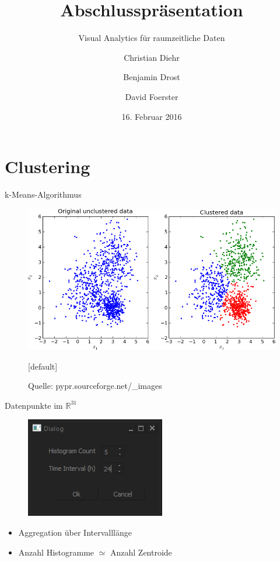 \documentclass{beamer}
\title{Abschlusspräsentation}
\subtitle{Visual Analytics für raumzeitliche Daten}
\author{Christian Diehr \and Benjamin Drost \and David Foerster}
\institute{Institut für Informatik\\Humboldt-Universität zu Berlin}
\date{16. Februar 2016}
\begin{document}
    \begin{frame}
        \titlepage
    \end{frame}
    \logo %

    \section{Clustering}
    \begin{frame}{k-Means-Algorithmus}
		\begin{figure}
			\centering\includegraphics[width=.7\textwidth]{kmeans.png}
			\caption{Quelle: pypr.sourceforge.net/\_images}
		\end{figure}
    \end{frame}

    \begin{frame}{Datenpunkte im $\mathds{R}^{31}$}
    	\begin{figure}
    		\centering\includegraphics[width=.4\textwidth]{dialog.png}
    	\end{figure}
    	\begin{itemize}
    		\setlength\itemsep{1em}
    		\item Aggregation über Intervalllänge
    		\item Anzahl Histogramme $\simeq$ Anzahl Zentroide
    	\end{itemize}
    \end{frame}
\end{document}
